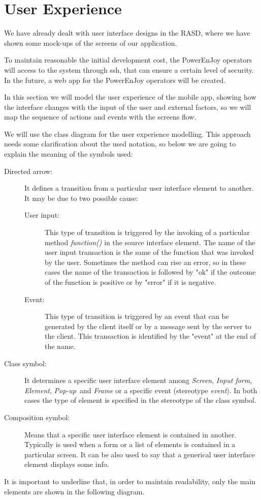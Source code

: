 \section{User Experience}
We have already dealt with user interface designs in the RASD, where we have shown some mock-ups of the screens of our application.

To maintain reasonable the initial development cost, the PowerEnJoy operators will access to the system through ssh, that can ensure a certain level of security. In the future, a web app for the PowerEnJoy operators will be created.

In this section we will model the user experience of the mobile app, showing how the interface changes with the input of the user and external factors, so we will map the sequence of actions and events with the screens flow.

We will use the class diagram for the user experience modelling. This approach needs some clarification about the used notation, so below we are going to explain the meaning of the symbols used:

\begin{description}
\item[Directed arrow:] It defines a transition from a particular user interface element to another. It may be due to two possible cause:
	\begin{description}
	\item[User input:] This type of transition is triggered by the invoking of a particular method \textit{function()} in the source interface element.
	The name of the user input transaction is the same of the function that was invoked by the user. Sometimes the method can rise an error, so in these cases the name of the transaction is followed by "ok" if the outcome of the function is positive or by "error" if it is negative. 
	\item[Event:] This type of transition is triggered by an event that can be generated by the client itself or by a message sent  by the server to the client. This transaction is identified by the "event" at the end of the name.
	\end{description} 
\item[Class symbol:] It determines a specific user interface element among \textit{Screen}, \textit{Input form}, \textit{Element}, \textit{Pop-up}\ and \textit{Frame}
or a specific event (stereotype \textit{event}). In both cases the type of element is specified in the stereotype of the class symbol. 
\item[Composition symbol:] Means that a specific user interface element is contained in another. Typically is used when a form or a list of elements is contained in a particular screen. It can be also used to say that a generical user interface element displays some info.
\end{description}

It is important to underline that, in order to maintain readability, only the main elements are shown in the following diagram.


